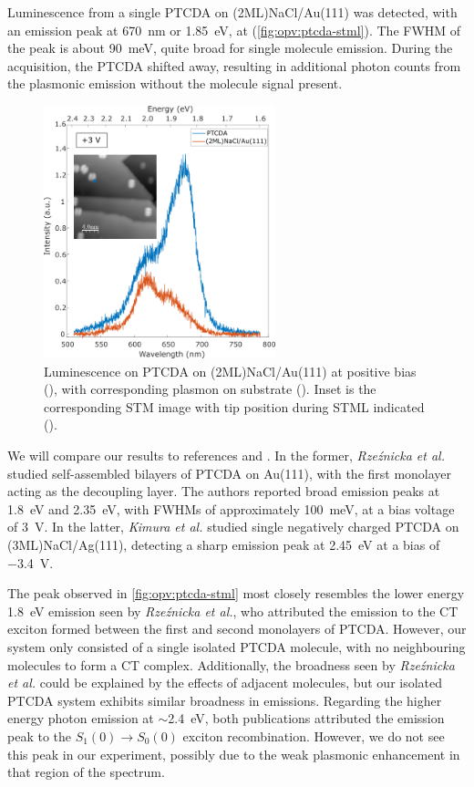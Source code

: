 Luminescence from a single PTCDA on (2ML)NaCl/Au(111) was detected, with an emission peak at \SI{670}{nm} or \SI{1.85}{eV}, at  (\autoref{fig:opv:ptcda-stml}). The \ac{FWHM} of the peak is about \SI{90}{meV}, quite broad for single molecule emission. During the acquisition, the PTCDA shifted away, resulting in additional photon counts from the plasmonic emission without the molecule signal present.


\begin{figure} [H]
    \centering
        \includegraphics[width=0.6\textwidth]{pictures/ptcda_+ve_emission_inset.png}
    \caption{Luminescence on PTCDA on (2ML)NaCl/Au(111) at positive bias (), with corresponding plasmon on substrate (). Inset is the corresponding STM image with tip position during STML indicated (). }
    \label{fig:opv:ptcda-stml}
\end{figure}

We will compare our results to references \citep{Rzeznicka2011} and \citep{Kimura2019}. In the former, \textit{Rze\'znicka et al.} studied self-assembled bilayers of PTCDA on Au(111), with the first monolayer acting as the decoupling layer. The authors reported broad emission peaks at \SI{1.8}{eV} and \SI{2.35}{eV}, with \acp{FWHM} of approximately \SI{100}{meV}, at a bias voltage of \SI{3}{V}. In the latter, \textit{Kimura et al.} studied single negatively charged PTCDA on (3ML)NaCl/Ag(111), detecting a sharp emission peak at \SI{2.45}{eV} at a bias of \SI{-3.4}{V}. 

The peak observed in \autoref{fig:opv:ptcda-stml} most closely resembles the lower energy \SI{1.8}{eV} emission seen by \textit{Rze\'znicka et al.}, who attributed the emission to the \ac{CT} exciton formed between the first and second monolayers of PTCDA. However, our system only consisted of a single isolated PTCDA molecule, with no neighbouring molecules to form a \ac{CT} complex. Additionally, the broadness seen by \textit{Rze\'znicka et al.} could be explained by the effects of adjacent molecules, but our isolated PTCDA system exhibits similar broadness in emissions. Regarding the higher energy photon emission at $\sim$\SI{2.4}{eV}, both publications attributed the emission peak to the $S_1(0) \rightarrow S_0(0)$ exciton recombination. However, we do not see this peak in our experiment, possibly due to the weak plasmonic enhancement in that region of the spectrum.

